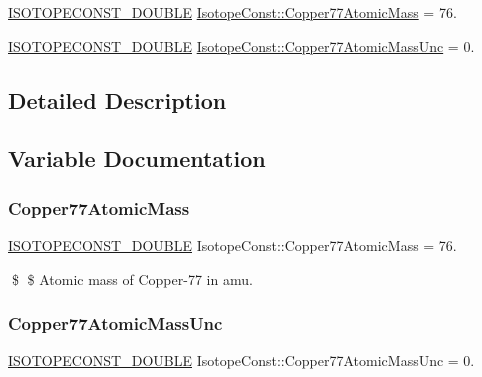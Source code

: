 \begin{DoxyCompactItemize}
\item 
\mbox{\hyperlink{group___isotope_const-_macros_ga8f45a7272ce02c0b4c65c44636ed719a}{I\+S\+O\+T\+O\+P\+E\+C\+O\+N\+S\+T\+\_\+\+D\+O\+U\+B\+LE}} \mbox{\hyperlink{group___isotope_const-_copper-_cu77_ga92a469a5c86a69311892e9db3e954f26}{Isotope\+Const\+::\+Copper77\+Atomic\+Mass}} = 76.
\item 
\mbox{\hyperlink{group___isotope_const-_macros_ga8f45a7272ce02c0b4c65c44636ed719a}{I\+S\+O\+T\+O\+P\+E\+C\+O\+N\+S\+T\+\_\+\+D\+O\+U\+B\+LE}} \mbox{\hyperlink{group___isotope_const-_copper-_cu77_ga2211b933a90068632c5e040d57be54d4}{Isotope\+Const\+::\+Copper77\+Atomic\+Mass\+Unc}} = 0.
\end{DoxyCompactItemize}


\subsection{Detailed Description}


\subsection{Variable Documentation}
\mbox{\label{group___isotope_const-_copper-_cu77_ga92a469a5c86a69311892e9db3e954f26}} 
\subsubsection{\texorpdfstring{Copper77\+Atomic\+Mass}{Copper77AtomicMass}}
{\footnotesize\ttfamily \mbox{\hyperlink{group___isotope_const-_macros_ga8f45a7272ce02c0b4c65c44636ed719a}{I\+S\+O\+T\+O\+P\+E\+C\+O\+N\+S\+T\+\_\+\+D\+O\+U\+B\+LE}} Isotope\+Const\+::\+Copper77\+Atomic\+Mass = 76.}

\$ \$ Atomic mass of Copper-\/77 in amu. \mbox{\label{group___isotope_const-_copper-_cu77_ga2211b933a90068632c5e040d57be54d4}} 
\subsubsection{\texorpdfstring{Copper77\+Atomic\+Mass\+Unc}{Copper77AtomicMassUnc}}
{\footnotesize\ttfamily \mbox{\hyperlink{group___isotope_const-_macros_ga8f45a7272ce02c0b4c65c44636ed719a}{I\+S\+O\+T\+O\+P\+E\+C\+O\+N\+S\+T\+\_\+\+D\+O\+U\+B\+LE}} Isotope\+Const\+::\+Copper77\+Atomic\+Mass\+Unc = 0.}

